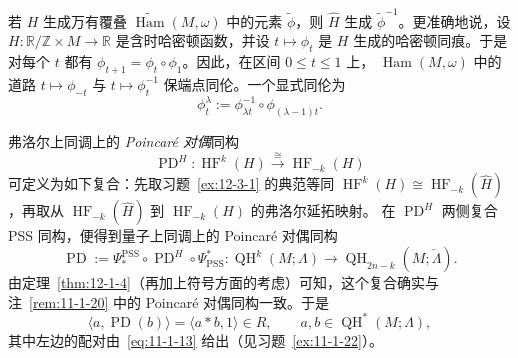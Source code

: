 \begin{remark}\label{rem:12-3-2}
若 $H$ 生成万有覆叠 $\widetilde{\operatorname{Ham}}(M,\omega)$ 中的元素
$\widetilde\phi$，则 $\widehat H$ 生成 $\widetilde\phi^{-1}$。更准确地说，设
$H:\mathbb R/\mathbb Z\times M\to\mathbb R$ 是含时哈密顿函数，并设
$t\mapsto\phi_t$ 是 $H$ 生成的哈密顿同痕。于是对每个 $t$ 都有
$\phi_{t+1}=\phi_t\circ\phi_1$。因此，在区间 $0\le t\le1$ 上，
$\operatorname{Ham}(M,\omega)$ 中的道路 $t\mapsto\phi_{-t}$ 与
$t\mapsto\phi_t^{-1}$ 保端点同伦。一个显式同伦为
\[
  \phi_t^\lambda:=\phi_{\lambda t}^{-1}\circ\phi_{(\lambda-1)t}.
\]
\end{remark}

弗洛尔上同调上的 \emph{Poincaré 对偶}同构
\[
  \operatorname{PD}^H:\operatorname{HF}^k(H)
  \overset{\cong}{\longrightarrow}\operatorname{HF}_{-k}(H)
\]
可定义为如下复合：先取习题~\ref{ex:12-3-1} 的典范等同
$\operatorname{HF}^k(H)\cong\operatorname{HF}_{-k}(\widehat H)$，再取从
$\operatorname{HF}_{-k}(\widehat H)$ 到 $\operatorname{HF}_{-k}(H)$ 的弗洛尔延拓映射。
在 $\operatorname{PD}^H$ 两侧复合 PSS 同构，便得到量子上同调上的 Poincaré 对偶同构
\[
  \operatorname{PD}:=\Psi_*^{\mathrm{PSS}}\circ
  \operatorname{PD}^H\circ\Psi^*_{\mathrm{PSS}}:
  \operatorname{QH}^k(M;\Lambda)
  \longrightarrow\operatorname{QH}_{2n-k}(M;\check\Lambda).
\]
由定理~\ref{thm:12-1-4}（再加上符号方面的考虑）可知，这个复合确实与
注~\ref{rem:11-1-20} 中的 Poincaré 对偶同构一致。于是
\[
  \langle a,\operatorname{PD}(b)\rangle
  =\langle a*b,1\rangle\in R,
  \qquad a,b\in\operatorname{QH}^*(M;\Lambda),
\]
其中左边的配对由~\eqref{eq:11-1-13} 给出（见习题~\ref{ex:11-1-22}）。

